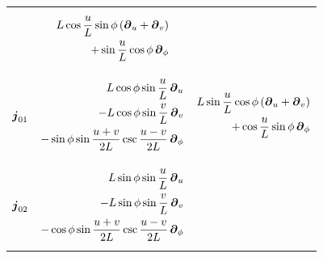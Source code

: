 \documentclass[a4paper,12pt]{article}
\begin{document}
\begin{table}[H]
\begin{adjustbox}{width=0.80\textwidth}
\begin{tabular}{ccc}
{\begin{equation*}
\begin{split}
                        \end{split}
                     \end{equation*}} & \parbox{0.3\textwidth}{\begin{equation*}
                        \begin{split}
                           L \cos\frac{u}{L} \sin\phi \, (\boldsymbol{\partial}_u + \boldsymbol{\partial}_v) \\ + \sin\frac{u}{L} \cos\phi \, \boldsymbol{\partial}_\phi 
                        \end{split}
                     \end{equation*}} \\
                     $\boldsymbol{j}_{0 1}$ & \parbox{0.3\textwidth}{\begin{equation*}
                        \begin{split}
                           L \cos\phi \sin\frac{u}{L} \, \boldsymbol{\partial}_u \\ - L \cos\phi \sin\frac{v}{L} \, \boldsymbol{\partial}_v \\ - \sin\phi \sin\frac{u+v}{2 L} \csc\frac{u-v}{2 L} \, \boldsymbol{\partial}_\phi
                        \end{split}
                     \end{equation*}} & \parbox{0.3\textwidth}{\begin{equation*}
                        \begin{split}
                           L \sin\frac{u}{L} \cos\phi \, (\boldsymbol{\partial}_u + \boldsymbol{\partial}_v) \\ + \cos\frac{u}{L} \sin\phi \, \boldsymbol{\partial}_\phi 
                        \end{split}
                     \end{equation*}} \\
                     $\boldsymbol{j}_{0 2}$ & \parbox{0.3\textwidth}{\begin{equation*}
                        \begin{split}
                           L \sin\phi \sin\frac{u}{L} \, \boldsymbol{\partial}_u \\ - L \sin\phi \sin\frac{v}{L} \, \boldsymbol{\partial}_v \\ - \cos\phi \sin\frac{u+v}{2 L} \csc\frac{u-v}{2 L} \, \boldsymbol{\partial}_\phi
                        \end{split}
                     \end{equation*}} & \parbox{0.3\textwidth}{\begin{equation*}
                        \begin{split}

\end{split}
\end{equation*}}
\end{tabular}
\end{adjustbox}
\end{table}
\end{document}
